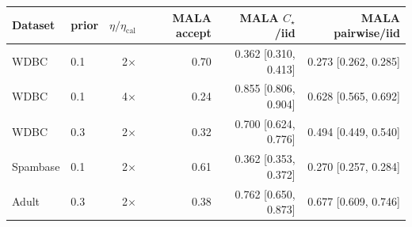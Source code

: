 \begin{tabular}{llrrrr}
\toprule
Dataset & prior & $\eta/\eta_{\mathrm{cal}}$ & MALA accept & MALA $C_\star$/iid & MALA pairwise/iid \\
\midrule
WDBC & 0.1 & 2$\times$ & 0.70 & 0.362 [0.310, 0.413] & 0.273 [0.262, 0.285] \\
WDBC & 0.1 & 4$\times$ & 0.24 & 0.855 [0.806, 0.904] & 0.628 [0.565, 0.692] \\
WDBC & 0.3 & 2$\times$ & 0.32 & 0.700 [0.624, 0.776] & 0.494 [0.449, 0.540] \\
Spambase & 0.1 & 2$\times$ & 0.61 & 0.362 [0.353, 0.372] & 0.270 [0.257, 0.284] \\
Adult & 0.3 & 2$\times$ & 0.38 & 0.762 [0.650, 0.873] & 0.677 [0.609, 0.746] \\
\bottomrule
\end{tabular}
